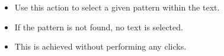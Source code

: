 \begin{itemize}
\item Use this action to select a given pattern within the text.
\item  If the pattern is not found, no text is selected.
\item This is achieved without performing any clicks. 
\end{itemize}


